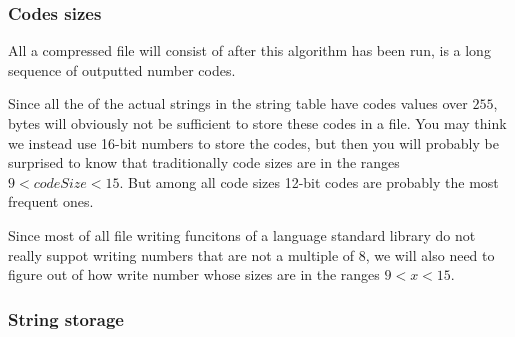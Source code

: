 \begin{refsection}
\begin{algorithm}[H]
\begin{algorithmic}[1]
    \While{\neof}

       
      \Else {}
        \State {}




        \EndIf


      \EndIf


    \EndWhile

    \State {}
    \State {}

  \end{algorithmic}
\end{algorithm}

\subsubsection{Codes sizes}

All a \lzw compressed file will consist of after this algorithm has
been run, is a long sequence of outputted number codes.

Since all the of the actual strings in the string table have codes
values over $255$, bytes will obviously not be sufficient to store
these codes in a file. You may think we instead use 16-bit numbers to
store the codes, but then you will probably be surprised to know that
traditionally code sizes are in the ranges $9 <
codeSize < 15$. But among all code sizes 12-bit codes are probably the
most frequent ones.

Since most of all file writing funcitons of a language standard
library do not really suppot writing numbers that are not a multiple
of 8, we will also need to figure out of how write number whose sizes
are in the ranges $9 < x < 15$.

\subsubsection{String storage}


\end{refsection}
